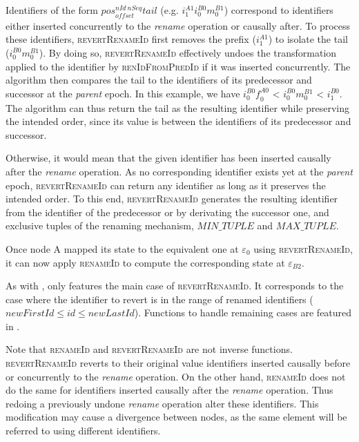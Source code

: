 \documentclass[10pt,journal,compsoc]{IEEEtran}
\newcommand{\eg}{e.g. }
\newcommand{\trm}[1]{\mathit{#1}}
\newcommand{\id}[3]{$\trm{#1}^{\trm{#2}}_{\trm{#3}}$}
\newcommand{\epoch}[1]{$\varepsilon_{#1}$}
\begin{document}
Identifiers of the form \id{pos}{nId~nSeq}{offset}$\trm{tail}$ (\eg \id{i}{A1}{1}\id{i}{B0}{0}\id{m}{B1}{0}) correspond to identifiers either inserted concurrently to the \emph{rename} operation or causally after.
To process these identifiers, \textsc{revertRenameId} first removes the prefix (\id{i}{A1}{1}) to isolate the tail (\id{i}{B0}{0}\id{m}{B1}{0}).
By doing so, \textsc{revertRenameId} effectively undoes the transformation applied to the identifier by \textsc{renIdFromPredId} if it was inserted concurrently.
The algorithm then compares the tail to the identifiers of its predecessor and successor at the \emph{parent} epoch.
In this example, we have \id{i}{B0}{0}\id{f}{A0}{0} < \id{i}{B0}{0}\id{m}{B1}{0} < \id{i}{B0}{1}.
The algorithm can thus return the tail as the resulting identifier while preserving the intended order, since its value is between the identifiers of its predecessor and successor.

Otherwise, it would mean that the given identifier has been inserted causally after the \emph{rename} operation.
As no corresponding identifier exists yet at the \emph{parent} epoch, \textsc{revertRenameId} can return any identifier as long as it preserves the intended order.
To this end, \textsc{revertRenameId} generates the resulting identifier from the identifier of the predecessor or by derivating the successor one, and exclusive tuples of the renaming mechanism, $\trm{MIN\_TUPLE}$ and $\trm{MAX\_TUPLE}$.

Once node A mapped its state to the equivalent one at \epoch{0} using \textsc{revertRenameId}, it can now apply \textsc{renameId} to compute the corresponding state at \epoch{B2}.

As with ,  only features the main case of \textsc{revertRenameId}.
It corresponds to the case where the identifier to revert is in the range of renamed identifiers ($\trm{newFirstId} \leq \trm{id} \leq \trm{newLastId}$).
Functions to handle remaining cases are featured in .

Note that \textsc{renameId} and \textsc{revertRenameId} are not inverse functions.
\textsc{revertRenameId} reverts to their original value identifiers inserted causally before or concurrently to the \emph{rename} operation.
On the other hand, \textsc{renameId} does not do the same for identifiers inserted causally after the \emph{rename} operation.
Thus redoing a previously undone \emph{rename} operation alter these identifiers.
This modification may cause a divergence between nodes, as the same element will be referred to using different identifiers.
\end{document}
